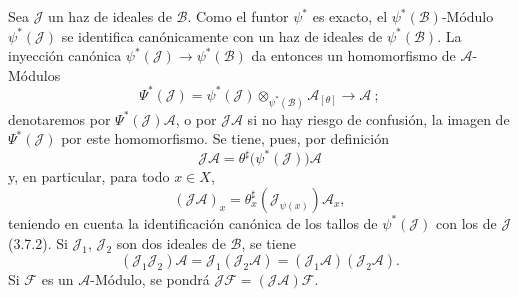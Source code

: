\begin{env}[4.3.5]
\label{0.4.3.5-fr}
Sea $\mathcal{J}$ un haz de ideales de $\mathcal{B}$. Como el funtor
$\psi^*$ es exacto, el $\psi^*(\mathcal{B})$-Módulo $\psi^*(\mathcal{J})$
se identifica canónicamente con un haz de ideales de $\psi^*(\mathcal{B})$.
La inyección canónica $\psi^*(\mathcal{J})\to\psi^*(\mathcal{B})$ da
entonces un homomorfismo de $\mathcal{A}$-Módulos
\[
  \Psi^*(\mathcal{J})
  =\psi^*(\mathcal{J})\otimes_{\psi^*(\mathcal{B})}\mathcal{A}_{[\theta]}
  \longrightarrow\mathcal{A}~;
\]
denotaremos por $\Psi^*(\mathcal{J})\mathcal{A}$, o por
$\mathcal{J}\mathcal{A}$ si no hay riesgo de confusión, la imagen de
$\Psi^*(\mathcal{J})$ por este homomorfismo. Se tiene, pues, por definición
\[
  \mathcal{J}\mathcal{A}
  =\theta^\sharp\bigl(\psi^*(\mathcal{J})\bigr)\mathcal{A}
\]
y, en particular, para todo $x\in X$,
\[
  (\mathcal{J}\mathcal{A})_x
  =\theta_x^\sharp(\mathcal{J}_{\psi(x)})\mathcal{A}_x,
\]
teniendo en cuenta la identificación canónica de los tallos de
$\psi^*(\mathcal{J})$ con los de $\mathcal{J}$ (3.7.2). Si
$\mathcal{J}_1$, $\mathcal{J}_2$ son dos ideales de $\mathcal{B}$, se tiene
\[
  (\mathcal{J}_1\mathcal{J}_2)\mathcal{A}
  =\mathcal{J}_1(\mathcal{J}_2\mathcal{A})
  =(\mathcal{J}_1\mathcal{A})(\mathcal{J}_2\mathcal{A}).
\]
Si $\mathcal{F}$ es un $\mathcal{A}$-Módulo, se pondrá
$\mathcal{J}\mathcal{F}=(\mathcal{J}\mathcal{A})\mathcal{F}$.
\end{env}
